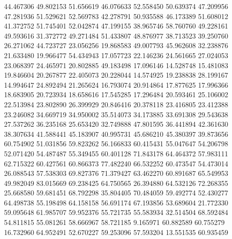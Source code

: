 44.467306
49.802153
51.656619
46.076633
52.558450
50.639374
47.209956
47.281936
51.529621
52.569783
42.278791
50.935588
46.173389
51.608012
41.372752
51.745401
52.042874
47.199155
38.965746
58.760760
49.228161
49.593616
31.372772
49.271484
51.433807
48.876977
38.713523
39.250760
26.271062
44.723727
23.056256
19.868583
49.007793
45.962608
32.238876
21.633480
19.966477
54.434943
17.057723
22.146236
24.561665
27.024053
23.068397
24.465971
20.802885
49.183498
17.096146
14.528748
15.481083
19.846604
20.267877
22.405073
20.228044
14.574925
19.238838
28.199167
14.994647
24.892494
21.265624
16.793074
20.914864
17.877625
17.996366
18.683905
20.723934
18.658616
17.545285
17.296484
20.593461
25.106002
22.513984
23.802890
26.399929
20.846416
20.378118
23.416805
23.412388
23.246082
34.669719
34.950002
35.514073
34.173885
33.691308
29.543638
27.537262
36.235168
25.653420
32.749888
47.801595
36.441894
42.361630
38.307634
41.588441
45.183907
40.995731
45.686210
45.380397
39.873656
60.754902
51.031856
59.823262
56.166833
60.415431
55.047647
54.206798
52.071420
54.487487
55.349455
60.401128
71.843178
64.464372
57.983111
62.715322
60.427561
60.866373
77.482240
66.532252
60.473547
54.473014
26.088543
57.538303
69.827376
71.379427
63.462270
60.891687
65.549953
49.982049
83.015669
69.238425
64.750565
26.394880
64.532126
72.268355
25.668580
59.681451
68.792298
35.804405
70.484059
59.492774
52.430277
64.498738
55.198498
64.158158
56.691174
67.193856
53.689604
21.772330
59.095648
61.985707
59.952376
55.721735
55.583934
32.514504
68.592484
54.811815
55.081261
58.666967
58.721185
9.165971
60.882589
60.755279
16.732960
64.952491
52.670227
59.253096
57.593204
13.551535
60.935459
